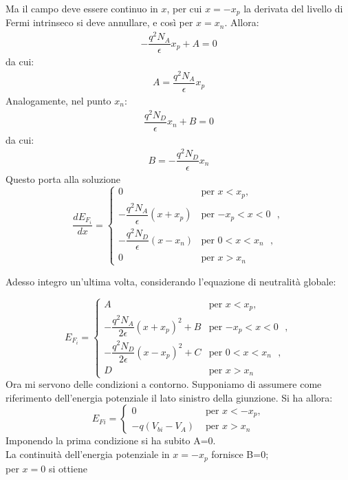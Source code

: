 Ma il campo deve essere continuo in $x$, per cui $x=-x_p$ la derivata del livello di Fermi intrinseco si deve annullare, e così per $x=x_n$. Allora:
\begin{align*}
    -\dfrac{q^2N_A}{\epsilon} x_p + A = 0
\end{align*}
da cui:
\begin{align*}
    A = \dfrac{q^2N_A}{\epsilon} x_p
\end{align*}
    Analogamente, nel punto $x_n$:
\begin{align*}
     \dfrac{q^2N_D}{\epsilon} x_n + B =0
\end{align*}
   da cui:
\begin{align*}
     B = -\dfrac{q^2N_D}{\epsilon} x_n
\end{align*}
Questo porta alla soluzione
\begin{equation}
    \dfrac{dE_{F_i}}{dx} = \begin{cases}
    0 & \text{per $x < x_p$},\\
    -\dfrac{q^2N_A}{\epsilon} (x + x_p) & \text{per $-x_p<x<0$ },\\
    -\dfrac{q^2N_D}{\epsilon} (x - x_n ) & \text{per $0<x<x_n$ },\\
    0 & \text{per $x>x_n$ }
\end{cases}
\end{equation}

Adesso integro un'ultima volta, considerando l'equazione di neutralità globale:

\begin{equation}
    E_{F_i}= \begin{cases}
    A & \text{per $x < x_p$},\\
    -\dfrac{q^2N_A}{2\epsilon} {(x + x_p)}^2 + B& \text{per $-x_p<x<0$ },\\
    -\dfrac{q^2N_D}{2\epsilon} {(x - x_p)}^2 + C& \text{per $0<x<x_n$ },\\
    D & \text{per $x>x_n$ }
\end{cases}
\end{equation}
Ora mi servono delle condizioni a contorno. Supponiamo di assumere come riferimento dell'energia potenziale il lato sinistro della giunzione. Si ha allora:
\begin{equation}
    E_{Fi}= \begin{cases}
        0 & \text{ per $x<-x_p$},\\
        -q(V_{bi}-V_A) & \text{ per $x>x_n$}
    \end{cases}
\end{equation}
Imponendo la prima condizione si ha subito A=0.\\
La continuità dell'energia potenziale in $x=-x_p$ fornisce B=0;\\
per $x=0$ si ottiene 


